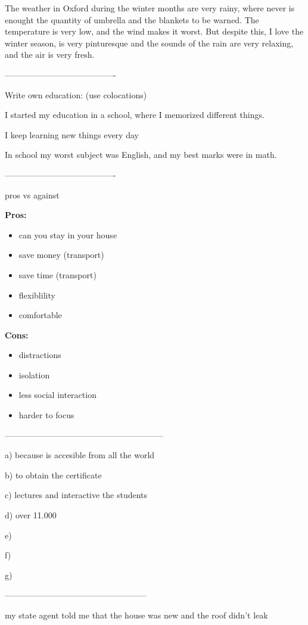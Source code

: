 The weather in Oxford during the winter months are very rainy, where never is enought the quantity of umbrella and the blankets to be warned. The temperature is very low, and the wind makes it worst.
But despite this, I love the winter season, is very pinturesque and the sounds of the rain are very relaxing, and the air is very fresh.


----------------------------------------


Write own education: (use colocations)

I started my education in a school, where I memorized different things.

I keep learning new things every day

In school my worst subject was English, and my best marks were in math.

----------------------------------------

pros vs against

\textbf{Pros:}
\begin{itemize}
    \item can you stay in your house
    \item save money (transport)
    \item save time (transport)
    \item flexiblility
    \item comfortable
\end{itemize}


\textbf{Cons:}
\begin{itemize}
    \item distractions
    \item isolation
    \item less social interaction
    \item harder to focus
\end{itemize}


---------------------------------------------------------

a) because is accesible from all the world

b) to obtain the certificate

c) lectures and interactive the students

d) over 11.000

e)

f)

g)


---------------------------------------------------


my state agent told me that the house was new and the roof didn't leak


